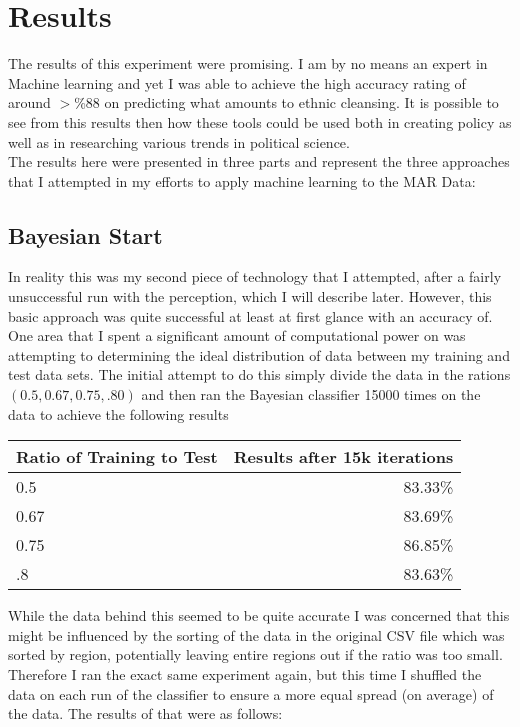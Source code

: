 \documentclass[12pt]{article}
\begin{document}
\section{Results}
	The results of this experiment were promising. I am by no means an expert in Machine learning and yet I was able to achieve the high accuracy rating of around $>\%88$ on predicting what amounts to ethnic cleansing. It is possible to see from this results then how these tools could be used both in creating policy as well as in researching various trends in political science.\\

	The results here were presented in three parts and represent the three approaches that I attempted in my efforts to apply machine learning to the MAR Data:

\subsection{Bayesian Start}
	In reality this was my second piece of technology that I attempted, after a fairly unsuccessful run with the perception, which I will describe later. However, this basic approach was quite successful at least at first glance with an accuracy of. \\

	One area that I spent a significant amount of computational power on was attempting to determining the ideal distribution of data between my training and test data sets. The initial attempt to do this simply divide the data in the rations $(0.5, 0.67, 0.75, .80)$ and then ran the Bayesian classifier 15000 times on the data to achieve the following results\\

\begin{center}
\begin{tabular}{l|r}
Ratio of Training to Test & Results after 15k iterations\\
\hline
0.5  & 83.33\% \\
0.67 & 83.69\% \\
0.75 & 86.85\% \\
.8   & 83.63\%
\end{tabular}
\end{center}

	While the data behind this seemed to be quite accurate I was concerned that this might be influenced by the sorting of the data in the original CSV file which was sorted by region, potentially leaving entire regions out if the ratio was too small. Therefore I ran the exact same experiment again, but this time I shuffled the data on each run of the classifier to ensure a more equal spread (on average) of the data. The results of that were as follows:
\end{document}
